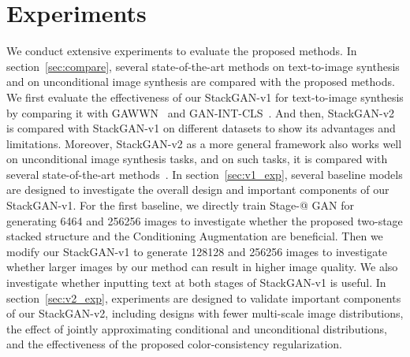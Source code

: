 \documentclass[10pt,journal,letterpaper,compsoc]{IEEEtran}
\makeatletter
\newcommand{\Rmnum}[1]{\expandafter\@slowromancap\romannumeral #1@}
\makeatother
\begin{document}
\section{Experiments} \label{sec:exp}
{
We conduct extensive experiments to evaluate the proposed methods. In section~\ref{sec:compare}, several state-of-the-art methods on text-to-image synthesis and on unconditional image synthesis are compared with the proposed methods. We first evaluate the effectiveness of our StackGAN-v1 for text-to-image synthesis by comparing it with GAWWN~\cite{reed2016learning} and GAN-INT-CLS~\cite{reed2016generative}. And then, StackGAN-v2 is compared with StackGAN-v1 on different datasets to show its advantages and limitations. Moreover, StackGAN-v2 as a more general framework also works well on unconditional image synthesis tasks, and on such tasks, it is compared with several state-of-the-art methods~\cite{Radford15,Zhao2016,Martin17WGAN,Mao2016,GulrajaniAADC17}. In section~\ref{sec:v1_exp}, several baseline models are designed to investigate the overall design and important components of our StackGAN-v1. For the first baseline, we directly train Stage-\Rmnum{1} GAN for generating 6464 and 256256 images to investigate whether the proposed two-stage stacked structure and the Conditioning Augmentation are beneficial. Then we modify our StackGAN-v1 to generate 128128 and 256256 images to investigate whether larger images by our method can result in higher image quality. We also investigate whether inputting text at both stages of StackGAN-v1 is useful. In section~\ref{sec:v2_exp}, experiments are designed to validate important components of our StackGAN-v2, including designs with fewer multi-scale image distributions, the effect of jointly approximating conditional and unconditional distributions, and the effectiveness of the proposed color-consistency regularization.  
}
\end{document}
